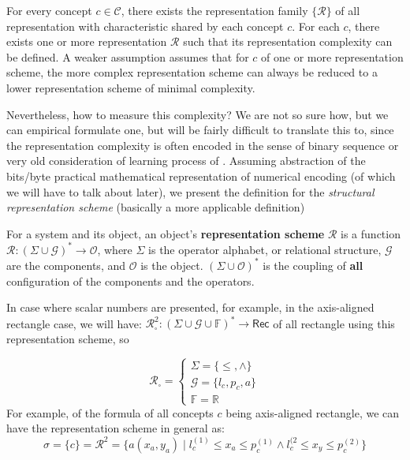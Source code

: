 \documentclass[10pt]{article}
\begin{document}
\begin{assumption}
    For every concept $c\in\mathcal{C}$, there exists the representation family $\{\mathcal{R}\}$ of all representation with characteristic shared by each concept $c$. For each $c$, there exists one or more representation $\mathcal{R}$ such that its representation complexity can be defined. A weaker assumption assumes that for $c$ of one or more representation scheme, the more complex representation scheme can always be reduced to a lower representation scheme of minimal complexity.
\end{assumption}
Nevertheless, how to measure this complexity? We are not so sure how, but we can empirical formulate one, but will be fairly difficult to translate this to, since the representation complexity is often encoded in the sense of binary sequence or very old consideration of learning process of \cite{10.5555/200548}. Assuming abstraction of the bits/byte practical mathematical representation of numerical encoding (of which we will have to talk about later), we present the definition for the \textit{structural representation scheme} (basically a more applicable definition)

\begin{definition}
    For a system and its object, an object's \textbf{representation scheme} $\mathcal{R}$ is a function $\bm{\mathcal{R}}: (\Sigma\cup \mathcal{G})^{*}\to \mathcal{O}$, where $\Sigma$ is the operator alphabet, or relational structure, $\mathcal{G}$ are the components, and $\mathcal{O}$ is the object. $(\Sigma \cup \mathcal{O})^{*}$ is the coupling of \textbf{all} configuration of the components and the operators. 
\end{definition}

In case where scalar numbers are presented, for example, in the axis-aligned rectangle case, we will have: $\bm{\mathcal{R}}^{2}_{\square}:(\Sigma\cup \mathcal{G}\cup\mathbb{F})^{*}\to \mathsf{Rec}$ of all rectangle using this representation scheme, so 

\begin{equation}
    \bm{\mathcal{R}}_{\square} = \begin{cases}
        \Sigma = \{\leq, \land \}\\
        \mathcal{G} = \{l_{c}, p_{c}, a\}\\
        \mathbb{F} = \mathbb{R}
    \end{cases}
\end{equation}
For example, of the formula of all concepts $c$ being axis-aligned rectangle, we can have the representation scheme in general as: 
\begin{equation}
    \sigma = \{c\} = \bm{\mathcal{R}}^{2} = \{a(x_{a},y_{a}) \mid l_{c}^{(1)} \leq x_{a}\leq p_{c}^{(1)}\land l_{c}^{(2} \leq x_{y}\leq p_{c}^{(2)}\}
\end{equation}
\end{document}
